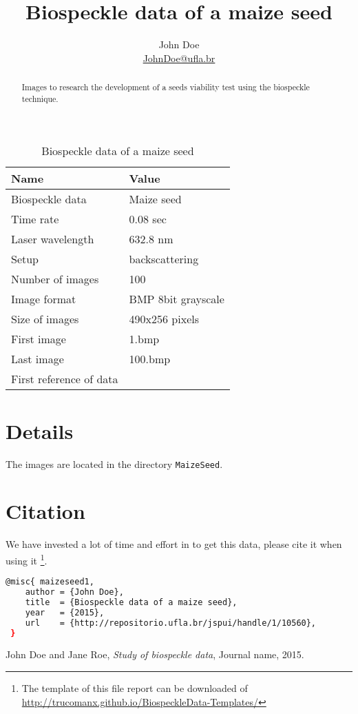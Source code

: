\documentclass[a4paper,10pt]{article}
\title{Biospeckle data of a maize seed}
\author{John Doe \\ \href{mailto:JohnDoe@deg.ufla.br}{JohnDoe@ufla.br} }
\begin{document}
\maketitle

\begin{abstract}
Images to research the development of a seeds viability test using the biospeckle technique.
\end{abstract}

\begin{table}[h]
\centering
\begin{tabular}{l |l}
\hline
\textbf{Name} 	& \textbf{Value}  \\ \hline \hline	
Biospeckle data	& Maize seed\\
Time rate	& 0.08 sec\\
Laser wavelength& 632.8 nm \\ 
Setup		& backscattering\\ 
\hline
Number of images& 100\\ 
Image format	& BMP 8bit grayscale \\
Size of images	& 490x256 pixels\\
\hline
First image	& 1.bmp\\ 
Last image	& 100.bmp\\ 
\hline
First reference of data	& \cite{ref1} \\ 
\hline
\end{tabular}
\caption{Biospeckle data of a maize seed}
\label{my-label}
\end{table}

\section*{Details}
The images are located in the directory \lstinline!MaizeSeed!.

\section*{Citation}
We have invested a lot of time and effort in to get this data, please cite it
when using it \footnote{The template of this file report can be downloaded of \url{http://trucomanx.github.io/BiospeckleData-Templates/}}.
\begin{lstlisting}[language=Bash]
@misc{ maizeseed1,
    author = {John Doe},
    title  = {Biospeckle data of a maize seed},
    year   = {2015},
    url    = {http://repositorio.ufla.br/jspui/handle/1/10560},
 }
\end{lstlisting}


\begin{thebibliography}{9}
John Doe and Jane Roe,
\emph{Study of biospeckle data},
Journal name, 2015.

\end{thebibliography}
\end{document}

